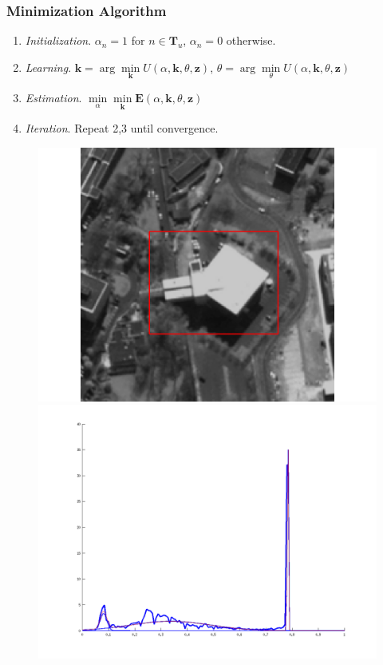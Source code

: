 \documentclass[compress]{beamer} %
\newcommand{\bfE}{\mathbf{E}}
\newcommand{\bfz}{\mathbf{z}}
\begin{document}
 \begin{frame}
  \frametitle{Minimization Algorithm}
  \begin{enumerate}
   \item \textit{Initialization}. $\alpha_n=1$ for $n\in \mathbf{T}_u$, $\alpha_n=0$ otherwise.
   \item \textit{Learning}. $\mathbf{k}=\arg\min\limits_{\mathbf{k}} U(\alpha,\mathbf{k},\theta,\bfz)$, $\theta=\arg\min\limits_{\theta} U(\alpha,\mathbf{k},\theta,\bfz)$
   \item \textit{Estimation}. $\min\limits_{\alpha}\min\limits_{\mathbf{k}}\bfE(\alpha,\mathbf{k},\theta,\bfz) $
   \item \textit{Iteration}. Repeat 2,3 until convergence.
  \end{enumerate}
  \begin{figure}[h!]
    \centering
    \begin{minipage}{0.27\linewidth}
    \includegraphics[width=\linewidth]{init}
    \end{minipage}
    \begin{minipage}{0.27\linewidth}
    \includegraphics[width=\linewidth]{fore_hist}

\end{minipage}
\end{figure}
\end{frame}
\end{document}
